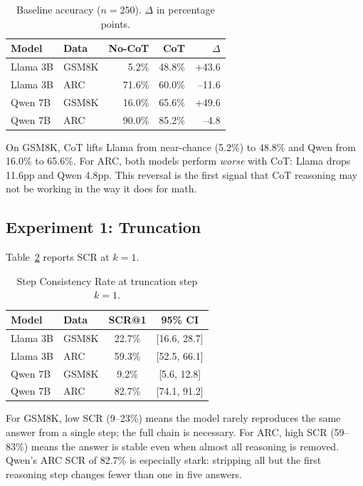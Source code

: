 \documentclass[11pt,twocolumn]{article}
\begin{document}
\begin{table}[h!]
\centering
\small
\begin{tabular}{llrrr}
\toprule
\textbf{Model} & \textbf{Data} & \textbf{No-CoT} & \textbf{CoT} & \textbf{$\Delta$} \\
\midrule
Llama 3B & GSM8K &  5.2\% & 48.8\% & +43.6 \\
Llama 3B & ARC   & 71.6\% & 60.0\% & --11.6 \\
Qwen 7B  & GSM8K & 16.0\% & 65.6\% & +49.6 \\
Qwen 7B  & ARC   & 90.0\% & 85.2\% & --4.8  \\
\bottomrule
\end{tabular}
\caption{Baseline accuracy ($n=250$). $\Delta$ in percentage points.}
\label{tab:baseline}
\end{table}

On GSM8K, CoT lifts Llama from near-chance (5.2\%) to 48.8\% and Qwen from
16.0\% to 65.6\%. For ARC, both models perform \emph{worse} with CoT: Llama
drops 11.6pp and Qwen 4.8pp. This reversal is the first signal that CoT
reasoning may not be working in the way it does for math.

\subsection{Experiment 1: Truncation}

Table~\ref{tab:truncation} reports SCR at $k=1$.

\begin{table}[h!]
\centering
\small
\begin{tabular}{llcc}
\toprule
\textbf{Model} & \textbf{Data} & \textbf{SCR@1} & \textbf{95\% CI} \\
\midrule
Llama 3B & GSM8K & 22.7\% & [16.6, 28.7] \\
Llama 3B & ARC   & 59.3\% & [52.5, 66.1] \\
Qwen 7B  & GSM8K &  9.2\% & [5.6,  12.8] \\
Qwen 7B  & ARC   & 82.7\% & [74.1, 91.2] \\
\bottomrule
\end{tabular}
\caption{Step Consistency Rate at truncation step $k=1$.}
\label{tab:truncation}
\end{table}

For GSM8K, low SCR (9--23\%) means the model rarely reproduces the same
answer from a single step; the full chain is necessary. For ARC, high SCR
(59--83\%) means the answer is stable even when almost all reasoning is
removed. Qwen's ARC SCR of 82.7\% is especially stark: stripping all but the
first reasoning step changes fewer than one in five answers.
\end{document}
